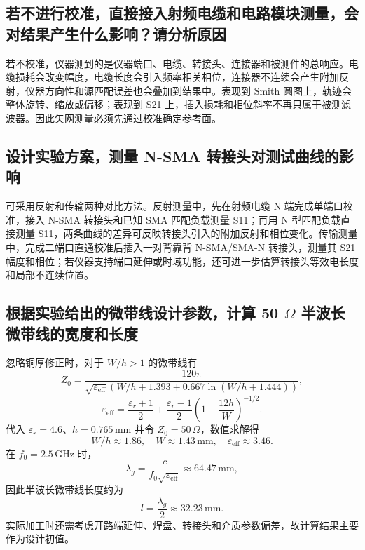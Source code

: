 \documentclass{ctexart}
\newcommand{\Zzero}{Z_0}
\begin{document}
\subsection{若不进行校准，直接接入射频电缆和电路模块测量，会对结果产生什么影响？请分析原因}

若不校准，仪器测到的是仪器端口、电缆、转接头、连接器和被测件的总响应。电缆损耗会改变幅度，电缆长度会引入频率相关相位，连接器不连续会产生附加反射，仪器方向性和源匹配误差也会叠加到结果中。表现到 Smith 圆图上，轨迹会整体旋转、缩放或偏移；表现到 S21 上，插入损耗和相位斜率不再只属于被测滤波器。因此矢网测量必须先通过校准确定参考面。

\subsection{设计实验方案，测量 N-SMA 转接头对测试曲线的影响}

可采用反射和传输两种对比方法。反射测量中，先在射频电缆 N 端完成单端口校准，接入 N-SMA 转接头和已知 SMA 匹配负载测量 S11；再用 N 型匹配负载直接测量 S11，两条曲线的差异可反映转接头引入的附加反射和相位变化。传输测量中，完成二端口直通校准后插入一对背靠背 N-SMA/SMA-N 转接头，测量其 S21 幅度和相位；若仪器支持端口延伸或时域功能，还可进一步估算转接头等效电长度和局部不连续位置。

\subsection{根据实验给出的微带线设计参数，计算 50 $\Omega$ 半波长微带线的宽度和长度}

忽略铜厚修正时，对于 $W/h>1$ 的微带线有
\begin{equation}
  \Zzero=\frac{120\pi}
  {\sqrt{\varepsilon_\mathrm{eff}}\left(W/h+1.393+0.667\ln(W/h+1.444)\right)},
\end{equation}
\begin{equation}
  \varepsilon_\mathrm{eff}=
  \frac{\varepsilon_r+1}{2}+
  \frac{\varepsilon_r-1}{2}\left(1+\frac{12h}{W}\right)^{-1/2}.
\end{equation}
代入 $\varepsilon_r=4.6$、$h=0.765\,\mathrm{mm}$ 并令 $\Zzero=50\,\Omega$，数值求解得
\[
  W/h\approx1.86,\quad W\approx1.43\,\mathrm{mm},\quad
  \varepsilon_\mathrm{eff}\approx3.46.
\]
在 $f_0=2.5\,\mathrm{GHz}$ 时，
\[
  \lambda_g=\frac{c}{f_0\sqrt{\varepsilon_\mathrm{eff}}}\approx64.47\,\mathrm{mm},
\]
因此半波长微带线长度约为
\[
  l=\frac{\lambda_g}{2}\approx32.23\,\mathrm{mm}.
\]
实际加工时还需考虑开路端延伸、焊盘、转接头和介质参数偏差，故计算结果主要作为设计初值。
\end{document}
